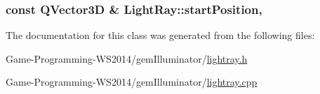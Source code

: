 \subsubsection[{start\+Position}]{\setlength{\rightskip}{0pt plus 5cm}const Q\+Vector3\+D \& Light\+Ray\+::start\+Position\hspace{0.3cm}{\ttfamily [read]}, {\ttfamily [write]}}\label{class_light_ray_af91b7c6c3c299e2a39b8c7f016f9ce15}


The documentation for this class was generated from the following files\+:\begin{DoxyCompactItemize}
\item 
Game-\/\+Programming-\/\+W\+S2014/gem\+Illuminator/\hyperlink{lightray_8h}{lightray.\+h}\item 
Game-\/\+Programming-\/\+W\+S2014/gem\+Illuminator/\hyperlink{lightray_8cpp}{lightray.\+cpp}\end{DoxyCompactItemize}
